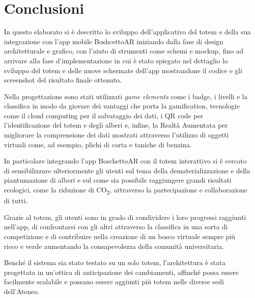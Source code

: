 \chapter{Conclusioni}
In questo elaborato si è descritto lo sviluppo dell'applicativo del totem e della sua integrazione con l'app mobile BoshcettoAR iniziando dalla fase di design architetturale e grafico, con l'aiuto di strumenti come schemi e mockup, fino ad arrivare alla fase d'implementazione in cui è stato spiegato nel dettaglio lo sviluppo del totem e delle nuove schermate dell'app mostrandone il codice e gli screenshot del risultato finale ottenuto.

Nella progettazione sono stati utilizzati \textit{game elements} come i badge, i livelli e la classifica in modo da giovare dei vantaggi che porta la gamification, tecnologie come il cloud computing per il salvataggio dei dati, i QR code per l'identificazione del totem e degli alberi e, infine, la Realtà Aumentata per migliorare la comprensione dei dati mostrati attraverso l'utilizzo di oggetti virtuali come, ad esempio, plichi di carta e taniche di benzina.

In particolare integrando l'app BoschettoAR con il totem interattivo si è cercato di sensibilizzare ulteriormente gli utenti sul tema della dematerializzazione e della piantumazione di alberi e sul come sia possibile raggiungere grandi risultati ecologici, come la riduzione di CO\textsubscript{2}, attraverso la partecipazione e collaborazione di tutti.

Grazie al totem, gli utenti sono in grado di condividere i loro progressi raggiunti nell'app, di confrontarsi con gli altri attraverso la classifica in una sorta di competizione e di contribuire nella creazione di un bosco virtuale sempre più ricco e verde aumentando la consapevolezza della comunità universitaria.

Benché il sistema sia stato testato su un solo totem, l’architettura è stata progettata in un’ottica di anticipazione dei cambiamenti, affinché possa essere facilmente scalabile e possano essere aggiunti più totem nelle diverse sedi dell’Ateneo.

